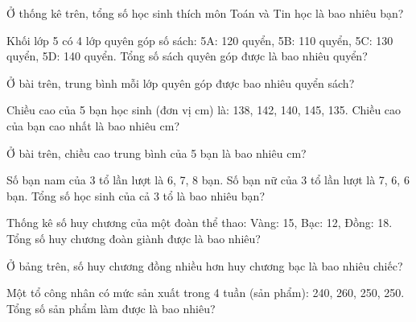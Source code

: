 \begin{ex}
  Ở thống kê trên, tổng số học sinh thích môn Toán và Tin học là bao nhiêu bạn?
\end{ex}

\begin{ex}
  Khối lớp 5 có 4 lớp quyên góp số sách: 5A: 120 quyển, 5B: 110 quyển, 5C: 130 quyển, 5D: 140 quyển. Tổng số sách quyên góp được là bao nhiêu quyển?
\end{ex}

\begin{ex}
  Ở bài trên, trung bình mỗi lớp quyên góp được bao nhiêu quyển sách?
\end{ex}

\begin{ex}
  Chiều cao của 5 bạn học sinh (đơn vị cm) là: 138, 142, 140, 145, 135. Chiều cao của bạn cao nhất là bao nhiêu cm?
\end{ex}

\begin{ex}
  Ở bài trên, chiều cao trung bình của 5 bạn là bao nhiêu cm?
\end{ex}

\begin{ex}
  Số bạn nam của 3 tổ lần lượt là 6, 7, 8 bạn. Số bạn nữ của 3 tổ lần lượt là 7, 6, 6 bạn. Tổng số học sinh của cả 3 tổ là bao nhiêu bạn?
\end{ex}

\begin{ex}
  Thống kê số huy chương của một đoàn thể thao: Vàng: 15, Bạc: 12, Đồng: 18. Tổng số huy chương đoàn giành được là bao nhiêu?
\end{ex}

\begin{ex}
  Ở bảng trên, số huy chương đồng nhiều hơn huy chương bạc là bao nhiêu chiếc?
\end{ex}

\begin{ex}
  Một tổ công nhân có mức sản xuất trong 4 tuần (sản phẩm): 240, 260, 250, 250. Tổng số sản phẩm làm được là bao nhiêu?
\end{ex}

